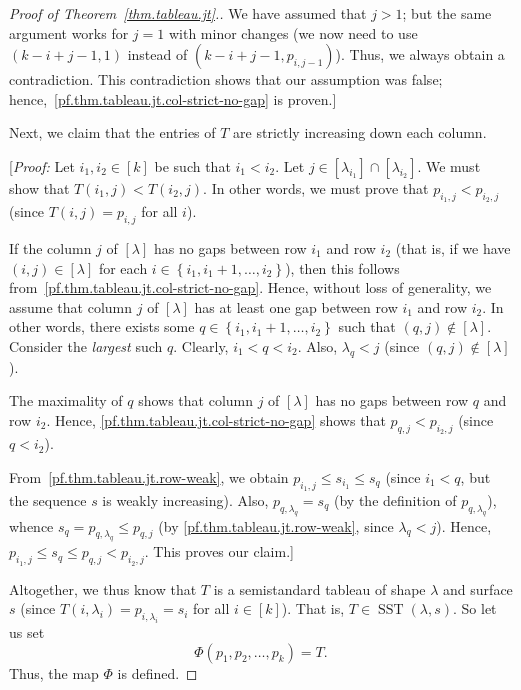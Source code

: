 \documentclass[reqno]{amsart}
\newcommand{\0}{\phantom{c}}
\newcommand{\diag}[1]{\left[#1\right]} %
\DeclareMathOperator{\SST}{SST} %
\newcommand{\set}[1]{\left\{ #1 \right\}}
\newcommand{\tup}[1]{\left( #1 \right)}
\newcommand{\ive}[1]{\left[ #1 \right]}
\theoremstyle{plain}
\theoremstyle{definition}
\numberwithin{equation}{section}
\begin{document}
\begin{proof}[Proof of Theorem~\ref{thm.tableau.jt}.]
We have assumed that $j > 1$; but the same argument works for $j = 1$ with minor
changes (we now need to use $\tup{k-i+j-1, 1}$ instead of $\tup{k-i+j-1, p_{i,j-1}}$).
Thus, we always obtain a contradiction.
This contradiction shows that our assumption was false; hence,~\eqref{pf.thm.tableau.jt.col-strict-no-gap} is proven.]

Next, we claim that the entries of $T$ are strictly increasing down each column.

[\textit{Proof:}
Let $i_1,i_2\in\ive{k}$ be such that $i_1 < i_2$.
Let $j \in \ive{\lambda_{i_1}} \cap \ive{\lambda_{i_2}}$.
We must show that $T( i_1,j) < T(i_2, j)$.
In other words, we must prove that $p_{i_1,j} < p_{i_2,j}$ (since $T(i,j) = p_{i,j}$ for all $i$).

If the column $j$ of $\diag{\lambda}$ has no gaps between row $i_1$ and row $i_2$ (that is, if we have $(i,j) \in \diag{\lambda}$ for each $i \in \set{i_1, i_1+1, \dotsc, i_2}$), then this follows from~\eqref{pf.thm.tableau.jt.col-strict-no-gap}.
Hence, without loss of generality, we assume that column $j$ of $\diag{\lambda}$ has at least one gap between row $i_1$ and row $i_2$.
In other words, there exists some $q \in \set{i_1, i_1+1, \dotsc, i_2}$ such that $(q,j) \notin \diag{\lambda}$.
Consider the \emph{largest} such $q$.
Clearly, $i_1 < q < i_2$.
Also, $\lambda_{q} < j$ (since $(q,j) \notin \diag{\lambda}$).

The maximality of $q$ shows that column $j$ of $[\lambda]$ has
no gaps between row $q$ and row $i_2$. Hence,
\eqref{pf.thm.tableau.jt.col-strict-no-gap} shows that $p_{q,j}<p_{i_2,j}$
(since $q<i_2$).

From~\eqref{pf.thm.tableau.jt.row-weak}, we obtain
$p_{i_1,j}\leq s_{i_1}\leq s_{q}$ (since $i_1<q$, but the sequence
$s$ is weakly increasing).
Also, $p_{q,\lambda_{q}}=s_{q}$ (by the definition of $p_{q,\lambda_{q}}$),
whence $s_{q}=p_{q,\lambda_{q}}\leq p_{q,j}$ (by
\eqref{pf.thm.tableau.jt.row-weak}, since $\lambda_{q}<j$). Hence,
$p_{i_1,j}\leq s_{q}\leq p_{q,j}<p_{i_2,j}$. This proves our claim.]

Altogether, we thus know that $T$ is a semistandard tableau of shape $\lambda$
and surface $s$ (since
$T\left(  i,\lambda_i\right)  =p_{i,\lambda_i}=s_i$ for all $i\in\ive{k}$).
That is, $T \in \SST(\lambda, s)$.
So let us set
\[
\Phi\left(  p_1,p_2,\ldots,p_k\right)  =T.
\]
Thus, the map $\Phi$ is defined.


\end{proof}
\end{document}
